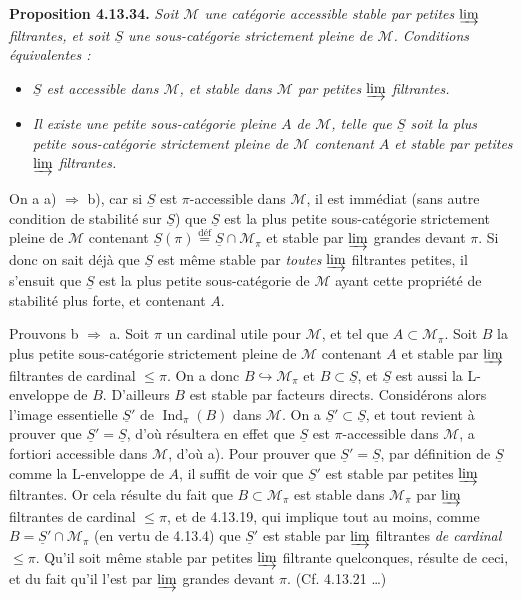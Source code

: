 \documentclass[11pt]{article}
\newcommand{\msp}[1]{\marginpar{\footnotesize [#1]}}
\DeclareMathOperator{\Ind}{Ind}
\newcommand{\limind}{\varinjlim}
\newcommand{\defeq}{\overset{\text{déf}}{=}}
\begin{document}
\textbf{Proposition 4.13.34.} \textit{Soit $\mathcal{M}$ une catégorie accessible stable par petites $\limind$ filtrantes, et soit $\underline{S}$ une sous-catégorie strictement pleine de $\mathcal{M}$. Conditions équivalentes :}
\begin{itemize}[leftmargin=2.5em]
\item[\textit{a)}] \textit{$\underline{S}$ est accessible dans $\mathcal{M}$, et stable dans $\mathcal{M}$ par petites $\limind$ filtrantes.}
\item[\textit{b)}] \textit{Il existe une petite sous-catégorie pleine $A$ de $\mathcal{M}$, telle que $\underline{S}$ soit la plus petite sous-catégorie strictement pleine de $\mathcal{M}$ contenant $A$ et stable par petites $\limind$ filtrantes.}
\end{itemize}

\msp{page 356}

On a a) $\Longrightarrow$ b), car si $\underline{S}$ est $\pi$-accessible dans $\mathcal{M}$, il est immédiat (sans autre condition de stabilité sur $\underline{S}$) que $\underline{S}$ est la plus petite sous-catégorie strictement pleine de $\mathcal{M}$ contenant $\underline{S}(\pi) \defeq \underline{S}\cap\mathcal{M}_\pi$ et stable par $\limind$ grandes devant $\pi$. Si donc on sait déjà que $\underline{S}$ est même stable par \textit{toutes} $\limind$ filtrantes petites, il s'ensuit que $\underline{S}$ est la plus petite sous-catégorie de $\mathcal{M}$ ayant cette propriété de stabilité plus forte, et contenant $A$.

Prouvons b $\Longrightarrow$ a. Soit $\pi$ un cardinal utile pour $\mathcal{M}$, et tel que $A \subset \mathcal{M}_\pi$. Soit $B$ la plus petite sous-catégorie strictement pleine de $\mathcal{M}$ contenant $A$ et stable par $\limind$ filtrantes de cardinal $\leqslant \pi$. On a donc $B \hookrightarrow \mathcal{M}_\pi$ et $B \subset \underline{S}$, et $\underline{S}$ est aussi la L-enveloppe de $B$. D'ailleurs $B$ est stable par
\msp{page 357}
facteurs directs. Considérons alors l'image essentielle $\underline{S}'$ de $\Ind_\pi(B)$ dans $\mathcal{M}$. On a $\underline{S}' \subset \underline{S}$, et tout revient à prouver que $\underline{S}' = \underline{S}$, d'où résultera en effet que $\underline{S}$ est $\pi$-accessible dans $\mathcal{M}$, a fortiori accessible dans $\mathcal{M}$, d'où a). Pour prouver que $\underline{S}' = \underline{S}$, par définition de $\underline{S}$ comme la L-enveloppe de $A$, il suffit de voir que $\underline{S}'$ est stable par petites $\limind$ filtrantes. Or cela résulte du fait que $B \subset \mathcal{M}_\pi$ est stable dans $\mathcal{M}_\pi$ par $\limind$ filtrantes de cardinal $\leqslant \pi$, et de 4.13.19, qui implique tout au moins, comme $B = \underline{S}' \cap \mathcal{M}_\pi$ (en vertu de 4.13.4) que $\underline{S}'$ est stable par $\limind$ filtrantes \textit{de cardinal} $\leqslant \pi$. Qu'il soit même stable par petites $\limind$ filtrante quelconques, résulte de ceci, et du fait qu'il l'est par $\limind$ grandes devant $\pi$. (Cf. 4.13.21 \dots) %
\end{document}
